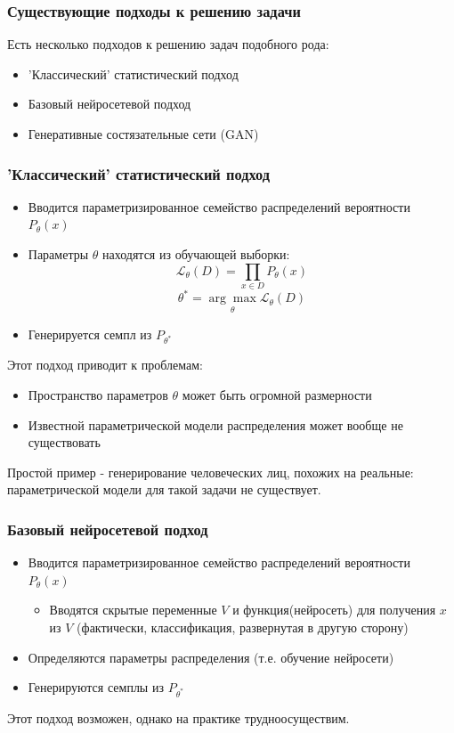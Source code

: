 \documentclass[9pt]{beamer}
\begin{document}
\begin{frame}\frametitle{Существующие подходы к решению задачи}
	Есть несколько подходов к решению задач подобного рода:
	\begin{itemize}
		\item 'Классический' статистический подход
		\item Базовый нейросетевой подход
		\item Генеративные состязательные сети (GAN)
	\end{itemize}
\end{frame}

\begin{frame}\frametitle{'Классический' статистический подход}
	\begin{itemize}
		\item Вводится параметризированное семейство распределений вероятности $P_{\theta}(x)$
		\item Параметры $\theta$ находятся из обучающей выборки:
		$$ \mathcal{L}_{\theta}(D) = \prod_{x \in D} P_{\theta}(x) $$
		$$ \theta^{*} = \underset{\theta}{\arg\max} \mathcal{L}_{\theta}(D)$$
		\item Генерируется семпл из $ P_{\theta^{*}}$
	\end{itemize}
	Этот подход приводит к проблемам:
	\begin{itemize}
		\item Пространство параметров $\theta$ может быть огромной размерности
		\item Известной параметрической модели распределения может вообще не существовать
	\end{itemize}
	Простой пример - генерирование человеческих лиц, похожих на реальные: параметрической модели для такой задачи не существует.
\end{frame}

\begin{frame}\frametitle{Базовый нейросетевой подход}
	\begin{itemize}
		\item Вводится параметризированное семейство распределений вероятности $P_{\theta}(x)$
		\begin{itemize}
			\item Вводятся скрытые переменные $V$ и функция(нейросеть) для получения $x$ из $V$ (фактически, классификация, развернутая в другую сторону)
		\end{itemize}
		\item Определяются параметры распределения (т.е. обучение нейросети)
		\item Генерируются семплы из $ P_{\theta^{*}}$
	\end{itemize}
	Этот подход возможен, однако на практике трудноосуществим.
\end{frame}
\end{document}
